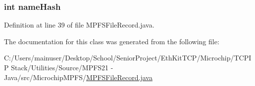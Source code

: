 \subsubsection[{name\+Hash}]{\setlength{\rightskip}{0pt plus 5cm}int name\+Hash}\label{class_microchip_m_p_f_s_1_1_m_p_f_s_file_record_ae0b29673435605296b85236b55a5fea2}


Definition at line 39 of file M\+P\+F\+S\+File\+Record.\+java.



The documentation for this class was generated from the following file\+:\begin{DoxyCompactItemize}
\item 
C\+:/\+Users/mainuser/\+Desktop/\+School/\+Senior\+Project/\+Eth\+Kit\+T\+C\+P/\+Microchip/\+T\+C\+P\+I\+P Stack/\+Utilities/\+Source/\+M\+P\+F\+S21 -\/ Java/src/\+Microchip\+M\+P\+F\+S/\hyperlink{_m_p_f_s_file_record_8java}{M\+P\+F\+S\+File\+Record.\+java}\end{DoxyCompactItemize}
